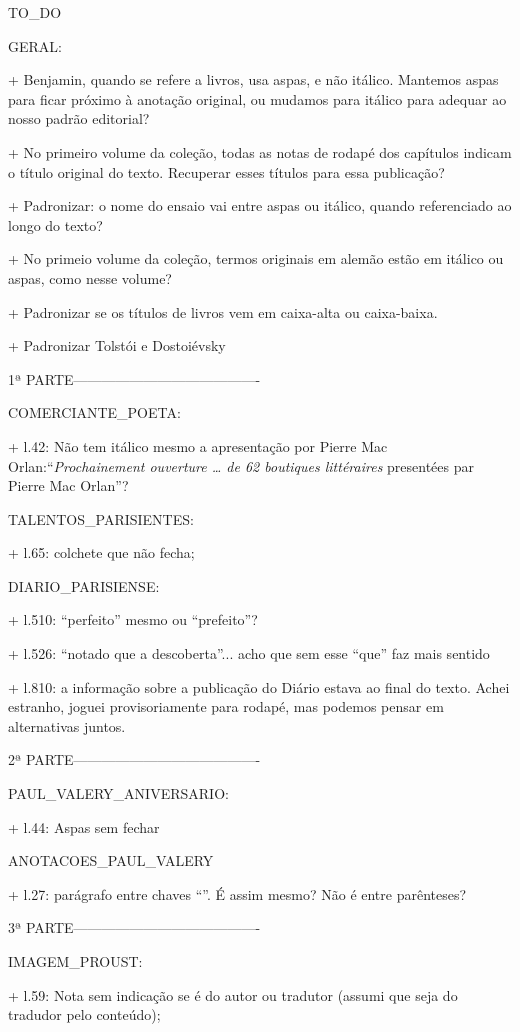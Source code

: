 TO_DO

GERAL:

+ Benjamin, quando se refere a livros, usa aspas, e não itálico. Mantemos aspas para ficar próximo à anotação original, ou mudamos para itálico para adequar ao nosso padrão editorial?

+ No primeiro volume da coleção, todas as notas de rodapé dos capítulos indicam o título original do texto. Recuperar esses títulos para essa publicação?

+ Padronizar: o nome do ensaio vai entre aspas ou itálico, quando referenciado ao longo do texto?

+ No primeio volume da coleção, termos originais em alemão estão em itálico ou aspas, como nesse volume?

+ Padronizar se os títulos de livros vem em caixa-alta ou caixa-baixa.

+ Padronizar Tolstói e Dostoiévsky

1ª PARTE----------------------------------------

COMERCIANTE_POETA:

+ l.42: Não tem itálico mesmo a apresentação por Pierre Mac Orlan:``\emph{Prochainement ouverture \ldots{} de 62 boutiques littéraires} presentées par Pierre Mac Orlan''?

TALENTOS_PARISIENTES:

+ l.65: colchete que não fecha;

DIARIO_PARISIENSE:

+ l.510: ``perfeito'' mesmo ou ``prefeito''?

+ l.526: ``notado que a descoberta''... acho que sem esse ``que'' faz mais sentido

+ l.810: a informação sobre a publicação do Diário estava ao final do texto. Achei estranho, joguei provisoriamente para rodapé, mas podemos pensar em alternativas juntos.


2ª PARTE----------------------------------------

PAUL_VALERY_ANIVERSARIO:

+ l.44: Aspas sem fechar


ANOTACOES_PAUL_VALERY

+ l.27: parágrafo entre chaves ``{}''. É assim mesmo? Não é entre parênteses?

3ª PARTE----------------------------------------

IMAGEM_PROUST:

+ l.59: Nota sem indicação se é do autor ou tradutor (assumi que seja do tradudor pelo conteúdo);

